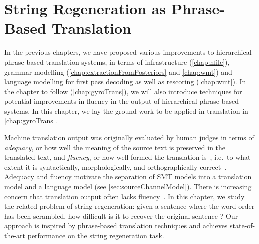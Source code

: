 \chapter{String Regeneration as Phrase-Based Translation}
\label{chap:gyro}


In the previous chapters, we have proposed various improvements to hierarchical
phrase-based translation systems, in terms of
infrastructure (\autoref{chap:hfile}), grammar
modelling (\autoref{chap:extractionFromPosteriors} and \autoref{chap:wmt})
and language modelling for first pass decoding as well as
rescoring (\autoref{chap:wmt}). In the
chapter to follow (\autoref{chap:gyroTrans}), we will also
introduce techniques for potential improvements in fluency in the output
of hierarchical phrase-based systems. In this chapter, we lay
the ground work to be applied in translation in \autoref{chap:gyroTrans}.

Machine translation output was originally evaluated by
human judges in terms
of \emph{adequacy}, or how well the meaning of the source
text is preserved in the translated text, and \emph{fluency},
or how well-formed the translation is~\citep{white-oconnell-carlson:1993:HLT},
i.e.\ to what extent it is syntactically, morphologically, and orthographically
correct~\citep{reiter-dale:1997:JNLE}.
Adequacy and fluency motivate the
separation of SMT models
into a translation model and a language model (see \autoref{sec:sourceChannelModel}).
There is increasing concern that translation output
often lacks fluency~\citep{knight:2007:TALK}.
In this chapter, we study the related problem of
string regeneration: given a sentence where the
word order has been scrambled, how difficult is it
to recover the original sentence ? Our approach
is inspired by phrase-based translation techniques and
achieves state-of-the-art performance on the string regeneration
task.

